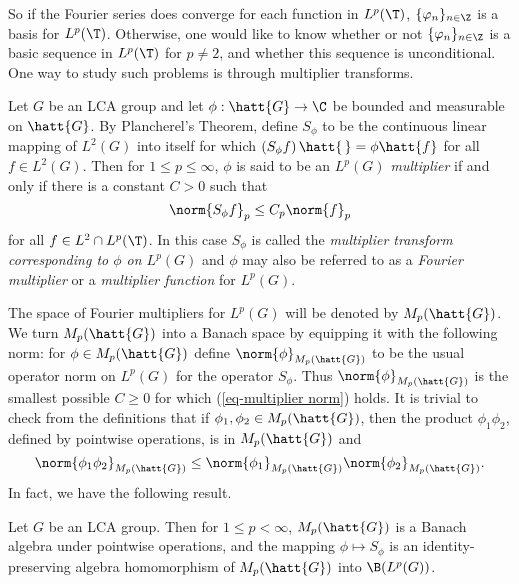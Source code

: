 So if the Fourier series does converge for each function in $L^p(\T)$,
$\{\varphi_n\}_{n\in\Z}$ is a basis for $L^p(\T)$. Otherwise,
one would like to know whether or not $\{\varphi_n\}_{n\in\Z}$ is a basic
sequence in $L^p(\T)$ for $p\neq2$, and whether this sequence is unconditional.
One way to study such problems is through multiplier transforms.

\begin{definition}\label{multipliers}
Let $G$ be an LCA group and let
$\phi:\hatt{G}\rightarrow\C$ be bounded and measurable on $\hatt{G}$. By
Plancherel's Theorem, define $S_{\phi}$ to be the continuous linear mapping of
$L^2(G)$ into itself for which
$({S_{\phi}f})\,\hatt{\,} = \phi \hatt{f}$ for all $f\in L^2(G)$.
Then for $1\leq p\leq\infty$, $\phi$ is said to be an
{\em $L^p(G)$ multiplier} if
and only if there is a constant $C>0$ such that
\begin{equation}\label{eq-multiplier norm}
\norm{S_{\phi}f}_p\leq C_p\norm{f}_p
\end{equation}
for all $f\in L^2\cap L^p(\T)$.
In this case $S_{\phi}$ is called the {\em multiplier transform corresponding
to $\phi$ on $L^p(G)$} and $\phi$ may also be referred to as a
{\em Fourier multiplier} or a {\em multiplier function} for $L^p(G)$.
\end{definition}


The space of Fourier multipliers for $L^p(G)$ will be denoted by
$M_p(\hatt{G})$. We turn $M_p(\hatt{G})$ into a Banach space by equipping it
with
the following norm: for $\phi\in M_p(\hatt{G})$ define
$\norm{\phi}_{M_p(\hatt{G})}$ to be the usual operator norm on $L^p(G)$ for the
operator $S_{\phi}$. Thus $\norm{\phi}_{M_p(\hatt{G})}$ is the smallest
possible $C\geq 0$ for which (\ref{eq-multiplier norm}) holds. It is
trivial to check from the definitions that if $\phi_1,\phi_2\in M_p(\hatt{G})$,
then the product $\phi_1\phi_2$, defined by pointwise operations, is in
$M_p(\hatt{G})$ and
\[\norm{\phi_1\phi_2}_{M_p(\hatt{G})}\leq\norm{\phi_1}_{M_p(\hatt{G})}
\norm{\phi_2}_{M_p(\hatt{G})}.\]
In fact, we have the following result.

\begin{proposition}\label{multiplier algebra}\cite[\S3]{BG Spectral}
Let $G$ be an LCA group. Then for $1\leq p<\infty$,
$M_p(\hatt{G})$ is a Banach algebra under pointwise operations, and the mapping
$\phi\mapsto S_{\phi}$ is an identity-preserving algebra homomorphism of
$M_p(\hatt{G})$ into $\B(L^p(G))$.
\end{proposition}

